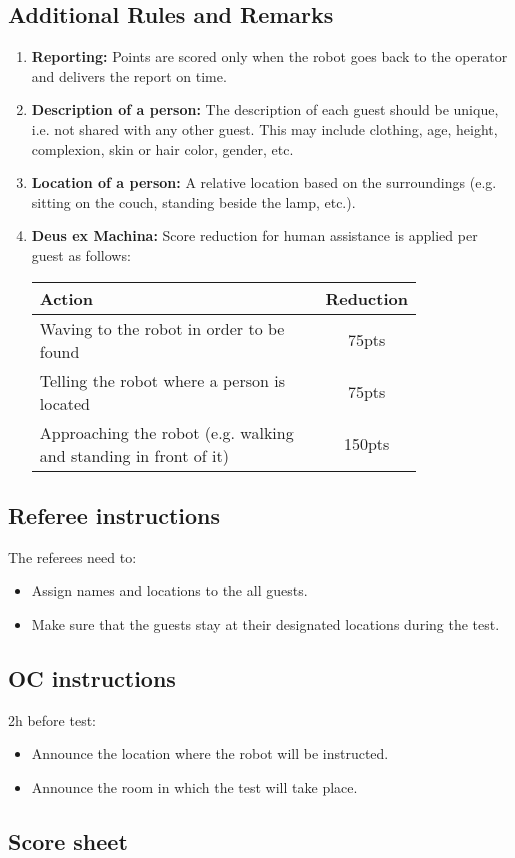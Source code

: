 \subsection*{Additional Rules and Remarks}
\begin{enumerate}[nosep]
	\item \textbf{Reporting:} Points are scored only when the robot goes back to the operator and delivers the report on time.

	\item \textbf{Description of a person:} The description of each guest should be unique, i.e. not shared with any other guest. This may include clothing, age, height, complexion, skin or hair color, gender, etc.

	\item \textbf{Location of a person:} A relative location based on the surroundings (e.g. sitting on the couch, standing beside the lamp, etc.).

	\item \textbf{Deus ex Machina:} Score reduction for human assistance is applied per guest as follows:
	\begin{table}[h]
		\begin{tabular}{m{0.8\linewidth} c}
			\textbf{Action} & \textbf{Reduction} \\\hline
			Waving to the robot in order to be found & 75pts \\
			Telling the robot where a person is located & 75pts \\
			Approaching the robot (e.g. walking and standing in front of it) & 150pts \\\hline
		\end{tabular}
	\end{table}
\end{enumerate}

\subsection*{Referee instructions}

The referees need to:
\begin{itemize}
	\item Assign names and locations to the all guests.
	\item Make sure that the guests stay at their designated locations during the test.
\end{itemize}

\subsection*{OC instructions}

2h before test:
\begin{itemize}
	\item Announce the location where the robot will be instructed.
	\item Announce the room in which the test will take place.
\end{itemize}

\subsection*{Score sheet}


